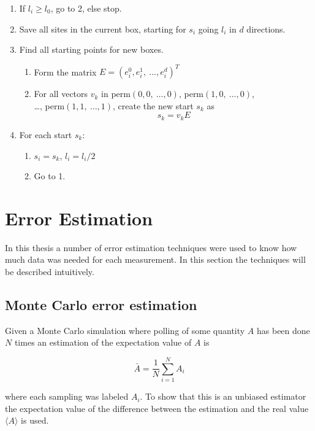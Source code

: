 \begin{enumerate}
    \item If $l_i \geq l_0$, go to 2, else stop.
%
    \item Save all sites in the current box, starting for $s_i$ going $l_i$ in $d$ directions.
%
    \item Find all starting points for new boxes.
%
    \begin{enumerate}[label=(\roman*)]
%
        \item Form the matrix $E = (e_i^0, e_i^1, \  \ldots, e_i^d)^T$
%
        \item For all vectors $v_k$ in perm$(0, 0, \ \ldots , 0)$, perm$(1, 0, \ \ldots , 0)$, \\ \ldots, perm$(1, 1, \ \ldots , 1)$, create the new start $s_k$ as $$s_k = v_k E$$
%
    \end{enumerate}
%
    \item For each start $s_k$:
    \begin{enumerate}[label=(\roman*)]
        \item $s_i = s_k$, $l_i = l_i / 2$
        \item Go to 1.
    \end{enumerate}
%
\end{enumerate}


\section{Error Estimation}
\label{sec:ErrorEst}

In this thesis a number of error estimation techniques were used to know how much data was needed for each measurement. In this section the techniques will be described intuitively.

\subsection{Monte Carlo error estimation}
\label{subsec:MonteCarloErrorEst}

Given a Monte Carlo simulation where polling of some quantity $A$ has been done $N$ times an estimation of the expectation value of $A$ is

\begin{equation}
    \bar A = \frac{1}{N} \sum_{i = 1}^{N} A_i
\end{equation}

where each sampling was labeled $A_i$. To show that this is an unbiased estimator the expectation value of the difference between the estimation and the real value $\langle A \rangle$ is used.

